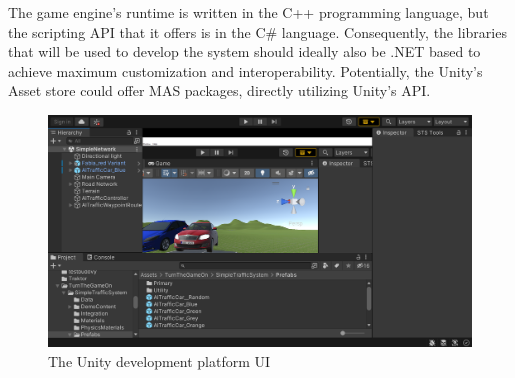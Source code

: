 \documentclass[main.tex]{subfiles}
\begin{document}
The game engine's runtime is written in the C++ programming language, but the scripting API 
that it offers is in the C\# language. Consequently, the libraries that will be used to develop 
the system should ideally also be .NET based to achieve maximum customization and interoperability.
Potentially, the Unity's Asset store could offer MAS packages, directly utilizing Unity's API.

\begin{figure}[htbp]
    \centering
    \includegraphics[width=.9\textwidth]{unityUI.png}
    \caption{The Unity development platform UI}
    \label{unity}
\end{figure}
\end{document}
